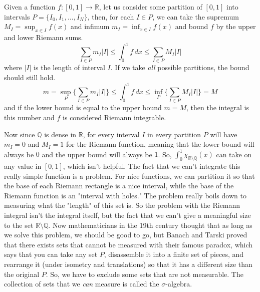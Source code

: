 \begin{definition}
  Given a function $f: [0, 1] \longrightarrow \mathbb{R}$, let us consider some partition of $[0, 1]$ into intervals $P = \{I_0, I_1, \ldots, I_N\}$, then, for each $I \in P$, we can take the supremum $M_I = \sup_{x \in I} f(x)$ and infimum $m_I = \inf_{x \in I} f(x)$ and bound $f$ by the upper and lower Riemann sums. 
  \begin{equation}
    \sum_{I \in P} m_I |I| \leq \int_0^1 f \,dx \leq \sum_{I \in P} M_I |I| 
  \end{equation}
  where $|I|$ is the length of interval $I$. If we take \textit{all} possible partitions, the bound should still hold. 
  \begin{equation}
    m = \sup_P \Big\{ \sum_{I \in P} m_I |I| \Big\} \leq \int_0^1 f \,dx \leq \inf_P \Big\{ \sum_{I \in P} M_I |I| \Big\} = M
  \end{equation}
  and if the lower bound is equal to the upper bound $m = M$, then the integral is this number and $f$ is considered Riemann integrable. 
\end{definition}

Now since $\mathbb{Q}$ is dense in $\mathbb{R}$, for every interval $I$ in every partition $P$ will have $m_I = 0$ and $M_I = 1$ for the Riemann function, meaning that the lower bound will always be $0$ and the upper bound will always be $1$. So, $\int_0^1 \chi_{\mathbb{R} \setminus \mathbb{Q}} (x)$ can take on any value in $[0, 1]$, which isn't helpful. The fact that we can't integrate this really simple function is a problem. For nice functions, we can partition it so that the base of each Riemann rectangle is a nice interval, while the base of the Riemann function is an "interval with holes." The problem really boils down to measuring what the "length" of this set is. So the problem with the Riemann integral isn't the integral itself, but the fact that we can't give a meaningful size to the set $\mathbb{R} \setminus \mathbb{Q}$. Now mathematicians in the 19th century thought that as long as we solve this problem, we should be good to go, but Banach and Tarski proved that there exists sets that cannot be measured with their famous paradox, which says that you can take any set $P$, disassemble it into a finite set of pieces, and rearrange it (under isometry and translations) so that it has a different size than the original $P$. So, we have to exclude some sets that are not measurable. The collection of sets that we \textit{can} measure is called the $\sigma$-algebra. 

